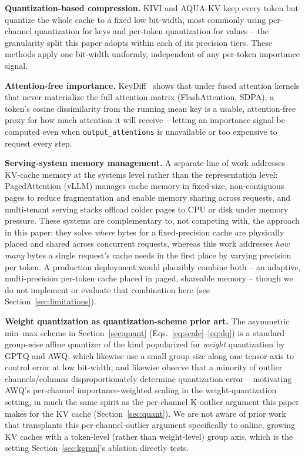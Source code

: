 \documentclass[conference]{IEEEtran}
\begin{document}
\textbf{Quantization-based compression.} KIVI and AQUA-KV keep every token but quantize
the whole cache to a fixed low bit-width, most commonly using per-channel quantization
for keys and per-token quantization for values -- the granularity split this paper
adopts within each of its precision tiers. These methods apply one bit-width uniformly,
independent of any per-token importance signal.

\textbf{Attention-free importance.} KeyDiff~\cite{keydiff} shows that under fused
attention kernels that never materialize the full attention matrix (FlashAttention,
SDPA), a token's cosine dissimilarity from the running mean key is a usable,
attention-free proxy for how much attention it will receive -- letting an importance
signal be computed even when \texttt{output\_attentions} is unavailable or too expensive
to request every step.

\textbf{Serving-system memory management.} A separate line of work addresses KV-cache
memory at the systems level rather than the representation level: PagedAttention
(vLLM) manages cache memory in fixed-size, non-contiguous pages to reduce
fragmentation and enable memory sharing across requests, and multi-tenant serving
stacks offload colder pages to CPU or disk under memory pressure. These systems are
complementary to, not competing with, the approach in this paper: they solve
\emph{where} bytes for a fixed-precision cache are physically placed and shared across
concurrent requests, whereas this work addresses \emph{how many} bytes a single
request's cache needs in the first place by varying precision per token. A
production deployment would plausibly combine both -- an adaptive, multi-precision
per-token cache placed in paged, shareable memory -- though we do not implement or
evaluate that combination here (see Section~\ref{sec:limitations}).

\textbf{Weight quantization as quantization-scheme prior art.} The asymmetric
min--max scheme in Section~\ref{sec:quant} (Eqs.~\ref{eq:scale}--\ref{eq:dq}) is a
standard group-wise affine quantizer of the kind popularized for \emph{weight}
quantization by GPTQ and AWQ, which likewise use a small group size along one tensor
axis to control error at low bit-width, and likewise observe that a minority of
outlier channels/columns disproportionately determine quantization error --
motivating AWQ's per-channel importance-weighted scaling in the weight-quantization
setting, in much the same spirit as the per-channel K-outlier argument this paper
makes for the KV cache (Section~\ref{sec:quant}). We are not aware of prior work that
transplants this per-channel-outlier argument specifically to online, growing KV
caches with a token-level (rather than weight-level) group axis, which is the
setting Section~\ref{sec:kgran}'s ablation directly tests.
\end{document}
